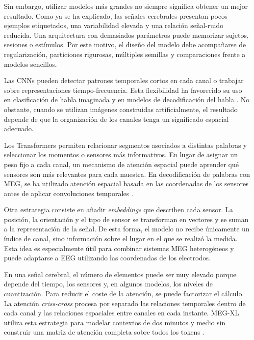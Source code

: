 Sin embargo, utilizar modelos más grandes no siempre significa obtener un mejor resultado. Como ya se ha explicado, las señales cerebrales presentan pocos ejemplos etiquetados, una variabilidad elevada y una relación señal-ruido reducida. Una arquitectura con demasiados parámetros puede memorizar sujetos, sesiones o estímulos. Por este motivo, el diseño del modelo debe acompañarse de regularización, particiones rigurosas, múltiples semillas y comparaciones frente a modelos sencillos.

Las CNNs pueden detectar patrones temporales cortos en cada canal o trabajar sobre representaciones tiempo-frecuencia. Esta flexibilidad ha favorecido su uso en clasificación de habla imaginada y en modelos de decodificación del habla \cite{defossez2023speech,dascoli2024words}. No obstante, cuando se utilizan imágenes construidas artificialmente, el resultado depende de que la organización de los canales tenga un significado espacial adecuado.

Los Transformers permiten relacionar segmentos asociados a distintas palabras y seleccionar los momentos o sensores más informativos. En lugar de asignar un peso fijo a cada canal, un mecanismo de atención espacial puede aprender qué sensores son más relevantes para cada muestra. En decodificación de palabras con MEG, se ha utilizado atención espacial basada en las coordenadas de los sensores antes de aplicar convoluciones temporales \cite{dascoli2024words,ozdogan2025libribrain}.

Otra estrategia consiste en añadir \textit{embeddings} que describen cada sensor. La posición, la orientación y el tipo de sensor se transforman en vectores y se suman a la representación de la señal. De esta forma, el modelo no recibe únicamente un índice de canal, sino información sobre el lugar en el que se realizó la medida. Esta idea es especialmente útil para combinar sistemas MEG heterogéneos y puede adaptarse a EEG utilizando las coordenadas de los electrodos.

En una señal cerebral, el número de elementos puede ser muy elevado porque depende del tiempo, los sensores y, en algunos modelos, los niveles de cuantización. Para reducir el coste de la atención, se puede factorizar el cálculo. La atención \textit{criss-cross} procesa por separado las relaciones temporales dentro de cada canal y las relaciones espaciales entre canales en cada instante. MEG-XL utiliza esta estrategia para modelar contextos de dos minutos y medio sin construir una matriz de atención completa sobre todos los tokens \cite{jayalath2026megxl}.

